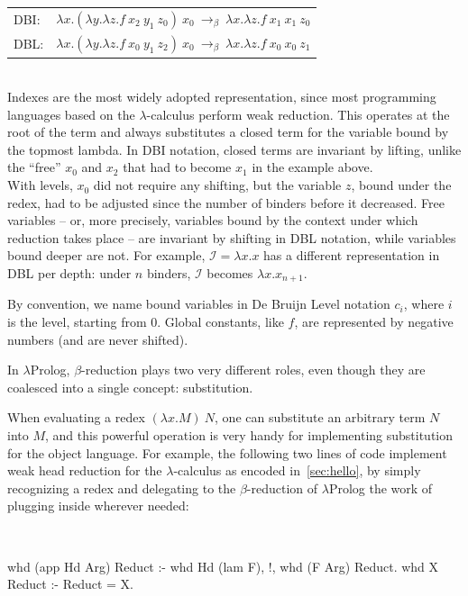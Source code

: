 \documentclass[a4paper, 11pt]{book}
\newenvironment{elpicode}
  {\VerbatimEnvironment~\\\begin{elpibox}\begin{xelpicode}}{\end{xelpicode}
\end{elpibox}\\}
\begin{document}
\noindent
\begin{tabular}{ll}
DBI: & $\lambda x.(\lambda y.\lambda z.f\ x_2\ y_1\ z_0)\ x_0\ \to_\beta\ \lambda x.\lambda z.f\ x_1\ x_1\ z_0$\\
DBL: & $\lambda x.(\lambda y.\lambda z.f\ x_0\ y_1\ z_2)\ x_0\ \to_\beta\ \lambda x.\lambda z.f\ x_0\ x_0\ z_1$\\
\end{tabular}
~\\


Indexes are the most widely adopted representation, since most programming
languages based on the $\lambda$-calculus perform weak reduction. This
operates at the root of the term and always substitutes a closed term for the
variable bound by the topmost lambda. In DBI notation, closed terms are
invariant by lifting, unlike the ``free'' $x_0$ and $x_2$ that had to become
$x_1$ in the example above.\\
With levels, $x_0$ did not require any shifting, but the variable $z$, bound
under the redex, had to be adjusted since the number of binders before it
decreased. Free variables -- or, more precisely, variables bound by the context
under which reduction takes place -- are invariant by shifting in DBL notation,
while variables bound deeper are not. For example, $\mathcal{I} = \lambda x.x$
has a different representation in DBL per depth: under $n$ binders,
$\mathcal{I}$ becomes $\lambda x.x_{n+1}$.


By convention, we name bound variables in De Bruijn Level notation $c_i$, where
$i$ is the level, starting from $0$. Global constants, like $f$, are
represented by negative numbers (and are never shifted).


In $\lambda$Prolog, $\beta$-reduction plays two very different roles, even
though they are coalesced into a single concept: substitution.


When evaluating a redex $(\lambda x.M)\ N$, one can substitute an arbitrary
term $N$ into $M$, and this powerful operation is very handy for implementing substitution
for the object language. For example, the following two lines of code
implement weak head reduction for the $\lambda$-calculus as encoded
in~\cref{sec:hello}, by simply recognizing a redex and delegating to the
$\beta$-reduction of $\lambda$Prolog the work of plugging  inside
wherever needed:

\begin{elpicode}
whd (app Hd Arg) Reduct :- whd Hd (lam F), !, whd (F Arg) Reduct.
whd X Reduct :- Reduct = X.
\end{elpicode}
\end{document}
